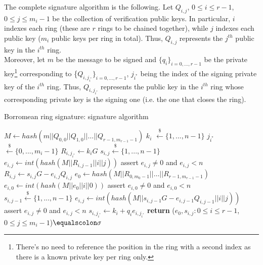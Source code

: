 The complete signature algorithm is the following. Let $Q_{i,j}$, $0 \leq i \leq r-1$, $0 \leq j \leq m_i-1$ be the collection of verification public keys. In particular, $i$ indexes each ring (these are $r$ rings to be chained together), while $j$ indexes each public key ($m_i$ public keys per ring in total). Thus, $Q_{i,j}$ represents the $j^{th}$ public key in the $i^{th}$ ring.\\
Moreover, let $m$ be the message to be signed and $\{q_i\}_{i=0,\dots,r-1}$ be the private key\footnote{There's no need to reference the position in the ring with a second index as there is a known private key per ring only.} corresponding to \{$Q_{i,j_{i^{*}}}\}_{i=0,\dots,r-1}$, $j_{i^{*}}$ being the index of the signing private key of the $i^{th}$ ring. Thus, $Q_{i,j_{i^{*}}}$ represents the public key in the $i^{th}$ ring whose corresponding private key is the signing one (i.e. the one that closes the ring).
\begin{algorithm}[H]
	\caption{Borromean ring signature: signature algorithm}
	\label{alg:Borromean_sign}
	\begin{algorithmic}[1]
		\State $M \gets hash(m||Q_{0,0}||Q_{1,0}||\dots||Q_{r-1,m_{r-1}-1})$
		\State $k_i$ $\xleftarrow{\text{\$}} \{1, ..., n - 1\}$ 
		\State $j_{i^{*}}$ $\xleftarrow{\text{\$}} \{0, ..., m_i - 1\}$
		\State $R_{i,j_{i^{*}}} \gets k_iG$
		\State $s_{i,j} \xleftarrow{\text{\$}} \{1, ..., n - 1\}$
		\State $e_{i,j} \gets int(hash(M||R_{i,j-1}||i||j))$
		\State assert $e_{i,j} \neq 0$ and $e_{i,j} < n$
		\State $R_{i,j} \gets s_{i,j}G - e_{i,j}Q_{i,j}$
		\EndFor
		\EndIf
		\EndFor
		\State $e_0 \gets hash(M||R_{0,m_0-1}||\dots||R_{r-1,m_{r-1}-1})$
		\State $e_{i,0} \gets int(hash(M||e_0||i||0))$
		\State assert $e_{i,0} \neq 0$ and $e_{i,0} < n$
		\State $s_{i,j-1} \xleftarrow{\text{\$}} \{1, ..., n - 1\}$
		\State $e_{i,j} \gets int(hash(M|| s_{i,j-1}G - e_{i,j-1}Q_{i,j-1}||i||j))$
		\State assert $e_{i,j} \neq 0$ and $e_{i,j} < n$
		\EndFor
		\State $s_{i,j_{i^{*}}} \gets k_i + q_ie_{i,j_{i^{*}}}$
		\EndFor
		\State \textbf{return} ($e_0, s_{i,j}: 0 \leq i \leq r-1$, $0 \leq j \leq m_i-1$)$\equalscolon \sigma$
		\EndProcedure
	\end{algorithmic}
\end{algorithm}
